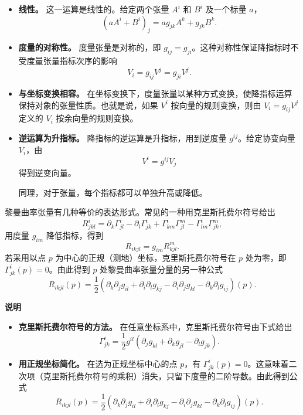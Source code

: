 \begin{itemize}
\item \textbf{线性。} 这一运算是线性的。给定两个张量 $A^i$ 和 $B^i$ 及一个标量 $a$，
\[
  (aA^i+B^i)_j=ag_{jk}A^k+g_{jk}B^k.
\]
\item \textbf{度量的对称性。} 度量张量是对称的，即 $g_{ij}=g_{ji}$。这种对称性保证降指标时不受度量张量指标次序的影响
\[
  V_i=g_{ij}V^j=g_{ji}V^j.
\]
\item \textbf{与坐标变换相容。} 在坐标变换下，度量张量以某种方式变换，使降指标运算保持对象的张量性质。也就是说，如果 $V^i$ 按向量的规则变换，则由 $V_i=g_{ij}V^j$ 定义的 $V_i$ 按余向量的规则变换。
\item \textbf{逆运算为升指标。} 降指标的逆运算是升指标，用到逆度量 $g^{ij}$。给定协变向量 $V_i$，由
\[
  V^i=g^{ij}V_j
\]
得到逆变向量。

同理，对于张量，每个指标都可以单独升高或降低。
\end{itemize}

黎曼曲率张量有几种等价的表达形式。常见的一种用克里斯托费尔符号给出
\begin{equation*}
  R^i_{jkl}=\partial_k\Gamma^i_{jl}-\partial_l\Gamma^i_{jk}
       +\Gamma^i_{km}\Gamma^m_{jl}-\Gamma^i_{lm}\Gamma^m_{jk},
  \tag{6E3}\label{eq:6E3}
\end{equation*}
用度量 $g_{im}$ 降低指标，得到
\begin{equation*}
  R_{ikjl}=g_{im}R^m_{kjl}.
  \tag{6E4}\label{eq:6E4}
\end{equation*}
若采用以点 $p$ 为中心的正规（测地）坐标，克里斯托费尔符号在 $p$ 处为零，即 $\Gamma^i_{jk}(p)=0$。由此得到 $p$ 处黎曼曲率张量分量的另一种公式
\[
  R_{ikjl}(p)=\frac12(\partial_k\partial_jg_{il}+\partial_i\partial_lg_{kj}
         -\partial_i\partial_jg_{kl}-\partial_k\partial_lg_{ij})(p).
\]

\noindent\textbf{说明}
\begin{itemize}
\item \textbf{克里斯托费尔符号的方法。} 在任意坐标系中，克里斯托费尔符号由下式给出
\begin{equation*}
  \Gamma^i_{jk}=\frac12g^{il}(\partial_jg_{kl}+\partial_kg_{jl}-\partial_lg_{jk}).
  \tag{6E5}\label{eq:6E5}
\end{equation*}
\item \textbf{用正规坐标简化。} 在选为正规坐标中心的点 $p$，有 $\Gamma^i_{jk}(p)=0$。这意味着二次项（克里斯托费尔符号的乘积）消失，只留下度量的二阶导数。由此得到公式
\[
  R_{ikjl}(p)=\frac12(\partial_k\partial_jg_{il}+\partial_i\partial_lg_{kj}
         -\partial_i\partial_jg_{kl}-\partial_k\partial_lg_{ij})(p).
\]
\end{itemize}


